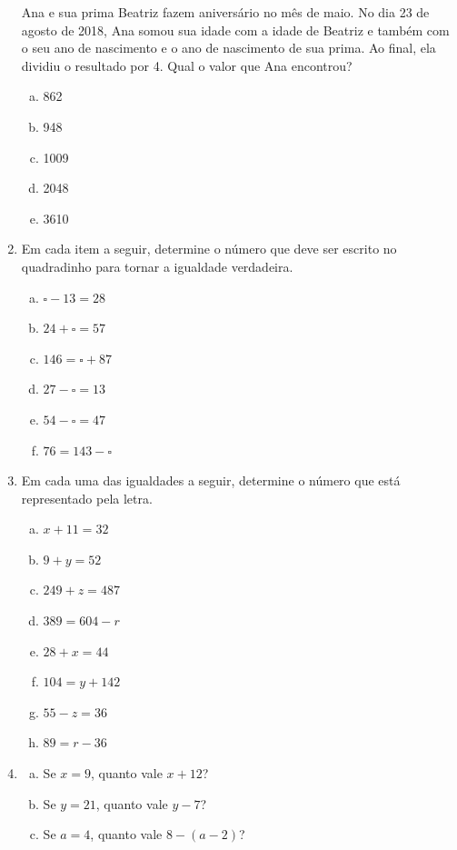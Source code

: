\documentclass[a4paper,14pt]{article}
\begin{document}
\begin{multicols}{2}
\begin{enumerate}
    		Ana e sua prima Beatriz fazem aniversário no mês de maio. No dia 23 de agosto de 2018, Ana somou sua idade com a idade de Beatriz e também com o seu ano de nascimento e o ano de nascimento de sua prima. Ao final, ela dividiu o resultado por 4. Qual o valor que Ana encontrou?
    		\begin{enumerate}[a)]
    			\item 862
    			\item 948
    			\item 1009
    			\item 2048
    			\item 3610 \newpage
    		\end{enumerate}
    		\item Em cada item a seguir, determine o número que deve ser escrito no quadradinho para tornar a igualdade verdadeira.
    		\begin{enumerate}[a)]
    			\item $\square - 13 = 28$
    			\item $24 + \square = 57$
    			\item $146 = \square + 87$
    			\item $27 - \square = 13$
    			\item $54 - \square = 47$
    			\item $76 = 143 - \square$
    		\end{enumerate}
    		\item Em cada uma das igualdades a seguir, determine o número que está representado pela letra.
    		\begin{enumerate}[a)]
    			\item $x + 11 = 32$
    			\item $9 + y = 52$
    			\item $249 + z = 487$
    			\item $389 = 604 - r$
    			\item $28 + x = 44$
    			\item $104 = y + 142$
    			\item $55 - z = 36$
    			\item $89 = r - 36$
    		\end{enumerate}
    		\item \begin{enumerate}[a)]
    			\item Se $x = 9$, quanto vale $x + 12$?
    			\item Se $y = 21$, quanto vale $y - 7$?
    			\item Se $a = 4$, quanto vale $8 - (a - 2)$? \\\\\\\\\\\\

\end{enumerate}
\end{enumerate}
\end{multicols}
\end{document}
